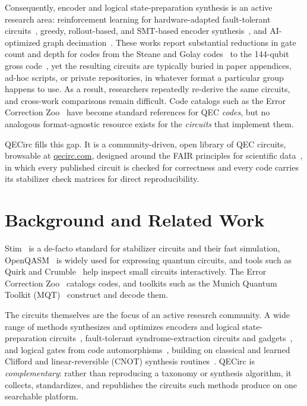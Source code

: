 \documentclass[conference]{IEEEtran}
\begin{document}
Consequently, encoder and logical state-preparation synthesis is an active research area: reinforcement learning for hardware-adapted fault-tolerant circuits~\cite{ZOC+:25}, greedy, rollout-based, and SMT-based encoder synthesis~\cite{PSWH:26}, and AI-optimized graph decimation~\cite{DPB+:26}. These works report substantial reductions in gate count and depth for codes from the Steane and Golay codes~\cite{Ste:96} to the 144-qubit gross code~\cite{BCG+:24}, yet the resulting circuits are typically buried in paper appendices, ad-hoc scripts, or private repositories, in whatever format a particular group happens to use. As a result, researchers repeatedly re-derive the same circuits, and cross-work comparisons remain difficult. Code catalogs such as the Error Correction Zoo~\cite{AF:22} have become standard references for QEC \emph{codes}, but no analogous format-agnostic resource exists for the \emph{circuits} that implement them.

QECirc fills this gap. It is a community-driven, open library of QEC circuits, browsable at \href{https://qecirc.com}{qecirc.com}, designed around the FAIR principles for scientific data~\cite{WDA+:16}, in which every published circuit is checked for correctness and every code carries its stabilizer check matrices for direct reproducibility.

\section{Background and Related Work}
Stim~\cite{Gid:21} is a de-facto standard for stabilizer circuits and their fast simulation, OpenQASM~\cite{CJA+:22} is widely used for expressing quantum circuits, and tools such as Quirk and Crumble~\cite{Gid:qk} help inspect small circuits interactively. The Error Correction Zoo~\cite{AF:22} catalogs codes, and toolkits such as the Munich Quantum Toolkit (MQT)~\cite{WBF+:24} construct and decode them.

The circuits themselves are the focus of an active research community. A wide range of methods synthesizes and optimizes encoders and logical state-preparation circuits~\cite{PSWH:26, ZOC+:25, DPB+:26, PSB+:25, RCKP:20, SPB+:25, CZO+:26, FA:25}, fault-tolerant syndrome-extraction circuits and gadgets~\cite{LPZ+:26, CR:18, CB:18, KLY+:25}, and logical gates from code automorphisms~\cite{SKW+:24}, building on classical and learned Clifford and linear-reversible (CNOT) synthesis routines~\cite{CLR+:26, BM:21, PMH:08, WKB:25, GMV:25, GM:24}. QECirc is \emph{complementary}: rather than reproducing a taxonomy or synthesis algorithm, it collects, standardizes, and republishes the circuits such methods produce on one searchable platform.
\end{document}
